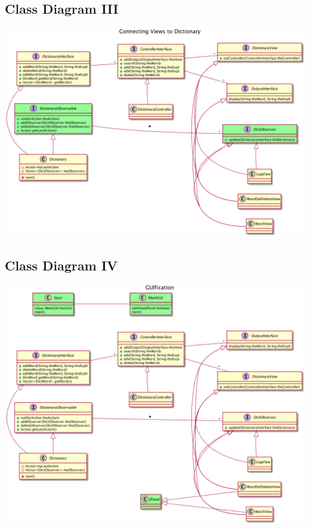 \documentclass[10pt,t,a4paper]{article}
\begin{document}
\subsection{Class Diagram III}
\label{sec:orgheadline11}
\includegraphics[width=.9\linewidth]{FDictionaryClass3.png}

\subsection{Class Diagram IV}
\label{sec:orgheadline12}
\includegraphics[width=.9\linewidth]{FDictionaryClass4.png}
\end{document}

